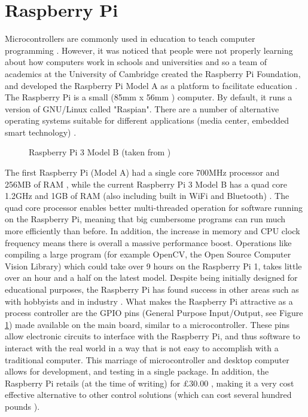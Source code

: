 \documentclass[twoside,a4]{report}
\def\br{\newline \newline \noindent}
\begin{document}
	\section{Raspberry Pi} %
	\noindent
	Microcontrollers are commonly used in education to teach computer programming \cite{backmcedu1, backmcedu2}. However, it was noticed that people were not properly learning about how computers work in schools and universities and so a team of academics at the University of Cambridge created the Raspberry Pi Foundation, and developed the Raspberry Pi Model A as a platform to facilitate education \cite{pihistory}. The Raspberry Pi is a small (85mm x 56mm \cite{pi3mechdraw}) computer. By default, it runs a version of GNU/Linux called "Raspian". There are a number of alternative operating systems suitable for different applications (media center, embedded smart technology) \cite{piotheros}.  \newline
	\begin{figure}[!htb]
	\centering
	\caption{Raspberry Pi 3 Model B (taken from  \cite{pi3info})}
	\label{pidia}
	\end{figure} \newline%
	The first Raspberry Pi (Model A) had a single core 700MHz processor and 256MB of RAM \cite{pi1info}, while the current Raspberry Pi 3 Model B has a quad core 1.2GHz and 1GB of RAM (also including built in WiFi and Bluetooth) \cite{pi3info}. The quad core processor enables better multi-threaded operation for software running on the Raspberry Pi, meaning that big cumbersome programs can run much more efficiently than before. In addition, the increase in memory and CPU clock frequency means there is overall a massive performance boost. Operations like compiling a large program (for example OpenCV, the Open Source Computer Vision Library) which could take over 9 hours \cite{pipowercompold} on the Raspberry Pi 1, takes little over an hour and a half \cite{pipowercompnew} on the latest model.\br
	Despite being initially designed for educational purposes, the Raspberry Pi has found success in other areas such as with hobbyists \cite{pihobbynotedu} and in industry \cite{pimorethanedu}. What makes the Raspberry Pi attractive as a process controller are the GPIO pins (General Purpose Input/Output, see Figure \ref{pidia}) made available on the main board, similar to a microcontroller. These pins allow electronic circuits to interface with the Raspberry Pi, and thus software to interact with the real world in a way that is not easy to accomplish with a traditional computer. This marriage of microcontroller and desktop computer allows for development, and testing in a single package. In addition, the Raspberry Pi retails (at the time of writing) for \pounds 30.00 \cite{picost}, making it a very cost effective alternative to other control solutions (which can cost several hundred pounds \cite{otherpcucost}). \br
\end{document}
